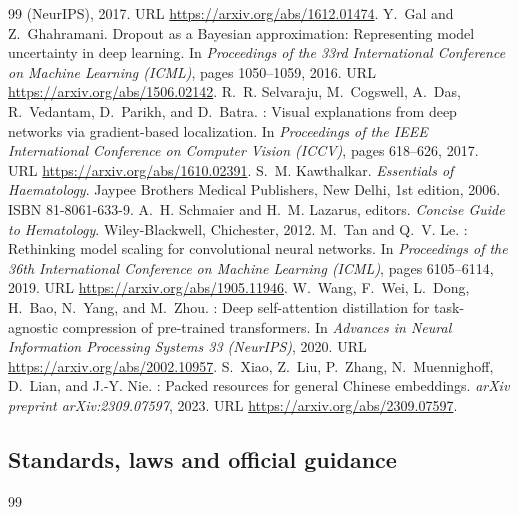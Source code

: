 {\begin{thebibliography}{99}
{  (NeurIPS)}, 2017.
\newblock URL \url{https://arxiv.org/abs/1612.01474}.
Y.~Gal and Z.~Ghahramani.
\newblock Dropout as a {B}ayesian approximation: Representing model uncertainty
  in deep learning.
\newblock In \emph{Proceedings of the 33rd International Conference on Machine
  Learning (ICML)}, pages 1050--1059, 2016.
\newblock URL \url{https://arxiv.org/abs/1506.02142}.
R.~R. Selvaraju, M.~Cogswell, A.~Das, R.~Vedantam, D.~Parikh, and D.~Batra.
: Visual explanations from deep networks via gradient-based
  localization.
\newblock In \emph{Proceedings of the IEEE International Conference on Computer
  Vision (ICCV)}, pages 618--626, 2017.
\newblock URL \url{https://arxiv.org/abs/1610.02391}.
S.~M. Kawthalkar.
\newblock \emph{Essentials of Haematology}.
\newblock Jaypee Brothers Medical Publishers, New Delhi, 1st edition, 2006.
\newblock ISBN 81-8061-633-9.
A.~H. Schmaier and H.~M. Lazarus, editors.
\newblock \emph{Concise Guide to Hematology}.
\newblock Wiley-Blackwell, Chichester, 2012.
M.~Tan and Q.~V. Le.
: Rethinking model scaling for convolutional neural
  networks.
\newblock In \emph{Proceedings of the 36th International Conference on Machine
  Learning (ICML)}, pages 6105--6114, 2019.
\newblock URL \url{https://arxiv.org/abs/1905.11946}.
W.~Wang, F.~Wei, L.~Dong, H.~Bao, N.~Yang, and M.~Zhou.
: Deep self-attention distillation for task-agnostic
  compression of pre-trained transformers.
\newblock In \emph{Advances in Neural Information Processing Systems 33
  (NeurIPS)}, 2020.
\newblock URL \url{https://arxiv.org/abs/2002.10957}.
S.~Xiao, Z.~Liu, P.~Zhang, N.~Muennighoff, D.~Lian, and J.-Y. Nie.
: Packed resources for general {Chinese} embeddings.
\newblock \emph{arXiv preprint arXiv:2309.07597}, 2023.
\newblock URL \url{https://arxiv.org/abs/2309.07597}.
\end{thebibliography}

\subsection*{Standards, laws and official guidance}
\begin{thebibliography}{99}


\end{thebibliography}}
